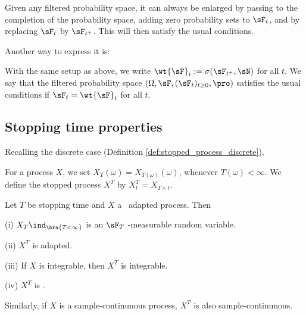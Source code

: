 Given any filtered probability space, it can always be enlarged by passing to the completion of the probability space, adding zero probability sets to $\sF_t$, and by replacing $\sF_t$ by $\sF_{t^+}$. This will then satisfy the usual conditions.

Another way to express it is:

\begin{definition}\label{def:completion_filtered_probability_space}
With the same setup as above, we write $\wt{\sF}_t := \sigma (\sF_{t^+},\sN)$ for all $t$. We say that the filtered probability space $(\Omega,\sF,(\sF_t)_{t\geq 0},\pro)$ satisfies the usual conditions if $\sF_t = \wt{\sF}_t$ for all $t$.
\end{definition}


\subsection{Stopping time properties}

Recalling the discrete case (Definition \ref{def:stopped_process_discrete}),

\begin{definition}\label{def:stopped_process_continuous}
For a process $X$, we set $X_T (\omega) = X_{T(\omega)}(\omega)$, whenever $T(\omega) < \infty$. We define the stopped process $X^T$ by $X^T_t = X_{T\land t}$.
\end{definition}

\begin{proposition}\label{pro:cadlag_adapted_process_property}
Let $T$ be stopping time and $X$ a \cadlag\ adapted process. Then
\ben
\item [(i)] $X_T\ind_{\bra{T < \infty}}$ is an $\sF_T$ -measurable random variable.
\item [(ii)] $X^T$ is adapted.
\item [(iii)] If $X$ is integrable, then $X^T$ is integrable.
\item [(iv)] $X^T$ is \cadlag.
\een
\end{proposition}

\begin{remark}
Similarly, if $X$ is a sample-continunous process, $X^T$ is also sample-continunous.
\end{remark}

